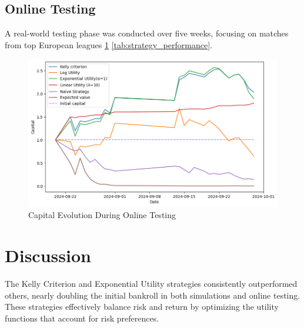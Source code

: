 \documentclass[6pt,twocolumn]{article}
\begin{document}
\subsection{Online Testing}
A real-world testing phase was conducted over five weeks, focusing on matches from top European leagues \ref{fig:capital_evolution} \ref{tab:strategy_performance}.

\begin{figure}[h]
    \centering
    \includegraphics[width=\linewidth]{statics/bankroll_evolution2.png}
    \caption{Capital Evolution During Online Testing}
    \label{fig:capital_evolution}
\end{figure}

\begin{table}[h]
\centering
{}
\caption{Strategy Performance Metrics}
\label{tab:strategy_performance}
\end{table}

\section{Discussion}
The Kelly Criterion and Exponential Utility strategies consistently outperformed others, nearly doubling the initial bankroll in both simulations and online testing. These strategies effectively balance risk and return by optimizing the utility functions that account for risk preferences.
\end{document}
